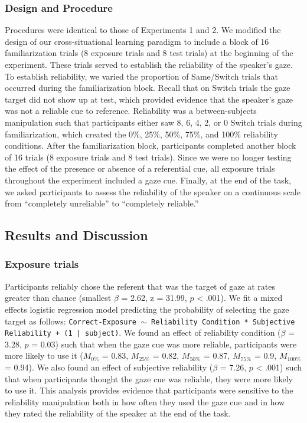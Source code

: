 \documentclass[oneside]{report}
\begin{document}
\hypertarget{design-and-procedure-2}{%
\subsubsection{Design and Procedure}\label{design-and-procedure-2}}

Procedures were identical to those of Experiments 1 and 2. We modified
the design of our cross-situational learning paradigm to include a block
of 16 familiarization trials (8 exposure trials and 8 test trials) at
the beginning of the experiment. These trials served to establish the
reliability of the speaker's gaze. To establish reliability, we varied
the proportion of Same/Switch trials that occurred during the
familiarization block. Recall that on Switch trials the gaze target did
not show up at test, which provided evidence that the speaker's gaze was
not a reliable cue to reference. Reliability was a between-subjects
manipulation such that participants either saw 8, 6, 4, 2, or 0 Switch
trials during familiarization, which created the 0\%, 25\%, 50\%, 75\%,
and 100\% reliability conditions. After the familiarization block,
participants completed another block of 16 trials (8 exposure trials and
8 test trials). Since we were no longer testing the effect of the
presence or absence of a referential cue, all exposure trials throughout
the experiment included a gaze cue. Finally, at the end of the task, we
asked participants to assess the reliability of the speaker on a
continuous scale from ``completely unreliable'' to ``completely
reliable.''

\hypertarget{results-and-discussion-2}{%
\subsection{Results and Discussion}\label{results-and-discussion-2}}

\hypertarget{exposure-trials-2}{%
\subsubsection{Exposure trials}\label{exposure-trials-2}}

Participants reliably chose the referent that was the target of gaze at
rates greater than chance (smallest \(\beta\) = 2.62, z = 31.99, \(p\)
\textless{} .001). We fit a mixed effects logistic regression model
predicting the probability of selecting the gaze target as follows:
\texttt{Correct-Exposure $\sim$ Reliability Condition * Subjective Reliability + (1 | subject)}.
We found an effect of reliability condition (\(\beta\) = 3.28, \(p\) =
0.03) such that when the gaze cue was more reliable, participants were
more likely to use it (\(M_{0\%}\) = 0.83, \(M_{25\%}\) = 0.82,
\(M_{50\%}\) = 0.87, \(M_{75\%}\) = 0.9, \(M_{100\%}\) = 0.94). We also
found an effect of subjective reliability (\(\beta\) = 7.26, \(p\)
\textless{} .001) such that when participants thought the gaze cue was
reliable, they were more likely to use it. This analysis provides
evidence that participants were sensitive to the reliability
manipulation both in how often they used the gaze cue and in how they
rated the reliability of the speaker at the end of the task.
\end{document}

